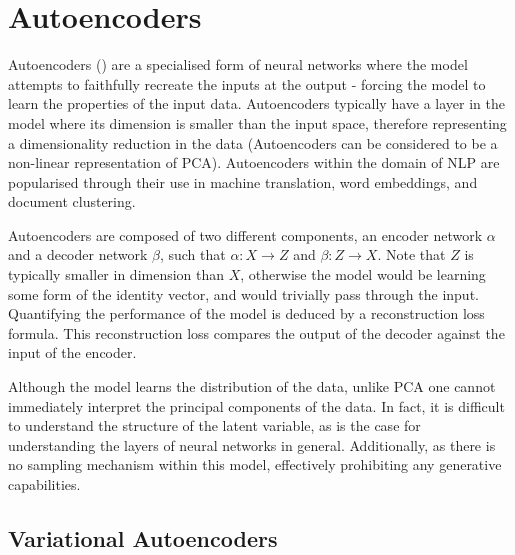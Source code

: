 \documentclass[12pt,twoside]{report}
\begin{document}
\section{Autoencoders}
\label{autoencoders}
Autoencoders (\cite{e._rumelhart_learning_1986}) are a specialised form of neural networks where the model attempts to faithfully recreate the inputs at the output - forcing the model to learn the properties of the input data. Autoencoders typically have a layer in the model where its dimension is smaller than the input space, therefore representing a dimensionality reduction in the data (Autoencoders can be considered to be a non-linear representation of PCA). Autoencoders within the domain of NLP are popularised through their use in machine translation, word embeddings, and document clustering. 

Autoencoders are composed of two different components, an encoder network $\alpha$ and a decoder network $\beta$, such that $\alpha : X \rightarrow Z$ and $\beta : Z \rightarrow X$. Note that $Z$ is typically smaller in dimension than $X$, otherwise the model would be learning some form of the identity vector, and would trivially pass through the input. Quantifying the performance of the model is deduced by a reconstruction loss formula. This reconstruction loss compares the output of the decoder against the input of the encoder.


Although the model learns the distribution of the data, unlike PCA one cannot immediately interpret the principal components of the data. In fact, it is difficult to understand the structure of the latent variable, as is the case for understanding the layers of neural networks in general. Additionally, as there is no sampling mechanism within this model, effectively prohibiting any generative capabilities. 

\subsection{Variational Autoencoders}
\label{variational_autoencoders}

\end{document}
